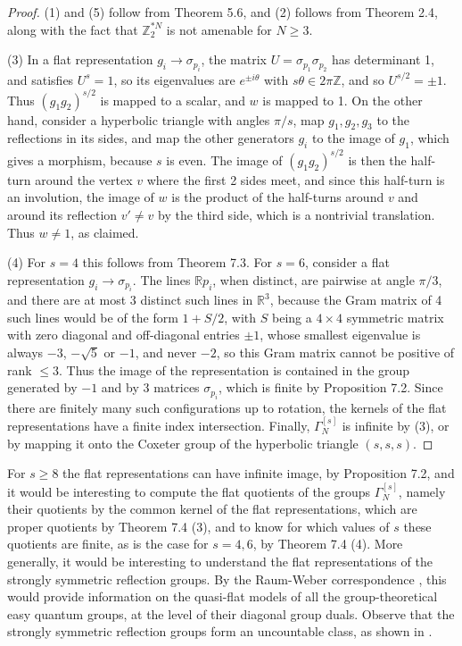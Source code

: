 \documentclass[12pt]{amsart}
\theoremstyle{definition}
\begin{document}
\begin{proof}
(1) and (5) follow from Theorem 5.6, and (2) follows from Theorem 2.4, along with the fact that $\mathbb Z_2^{*N}$ is not amenable for $N\geq3$.

(3) In a flat representation $g_i\to\sigma_{p_i}$, the matrix $U=\sigma_{p_1}\sigma_{p_2}$ has determinant 1, and satisfies $U^s=1$, so its eigenvalues are $e^{\pm i\theta}$ with $s\theta\in2\pi\mathbb Z$, and so $U^{s/2}=\pm1$. Thus $(g_1g_2)^{s/2}$ is mapped to a scalar, and $w$ is mapped to 1. On the other hand, consider a hyperbolic triangle with angles $\pi/s$, map $g_1,g_2,g_3$ to the reflections in its sides, and map the other generators $g_i$ to the image of $g_1$, which gives a morphism, because $s$ is even. The image of $(g_1g_2)^{s/2}$ is then the half-turn around the vertex $v$ where the first 2 sides meet, and since this half-turn is an involution, the image of $w$ is the product of the half-turns around $v$ and around its reflection $v'\neq v$ by the third side, which is a nontrivial translation. Thus $w\neq1$, as claimed.

(4) For $s=4$ this follows from Theorem 7.3. For $s=6$, consider a flat representation $g_i\to\sigma_{p_i}$. The lines $\mathbb Rp_i$, when distinct, are pairwise at angle $\pi/3$, and there are at most 3 distinct such lines in $\mathbb R^3$, because the Gram matrix of 4 such lines would be of the form $1+S/2$, with $S$ being a $4\times4$ symmetric matrix with zero diagonal and off-diagonal entries $\pm1$, whose smallest eigenvalue is always $-3$, $-\sqrt{5}$ or $-1$, and never $-2$, so this Gram matrix cannot be positive of rank $\leq3$. Thus the image of the representation is contained in the group generated by $-1$ and by 3 matrices $\sigma_{p_i}$, which is finite by Proposition 7.2. Since there are finitely many such configurations up to rotation, the kernels of the flat representations have a finite index intersection. Finally, $\Gamma_N^{[s]}$ is infinite by (3), or by mapping it onto the Coxeter group of the hyperbolic triangle $(s,s,s)$.
\end{proof}

For $s\geq8$ the flat representations can have infinite image, by Proposition 7.2, and it would be interesting to compute the flat quotients of the groups $\Gamma_N^{[s]}$, namely their quotients by the common kernel of the flat representations, which are proper quotients by Theorem 7.4 (3), and to know for which values of $s$ these quotients are finite, as is the case for $s=4,6$, by Theorem 7.4 (4). More generally, it would be interesting to understand the flat representations of the strongly symmetric reflection groups. By the Raum-Weber correspondence \cite{rw2}, this would provide information on the quasi-flat models of all the group-theoretical easy quantum groups, at the level of their diagonal group duals. Observe that the strongly symmetric reflection groups form an uncountable class, as shown in \cite{rw2}.
\end{document}
